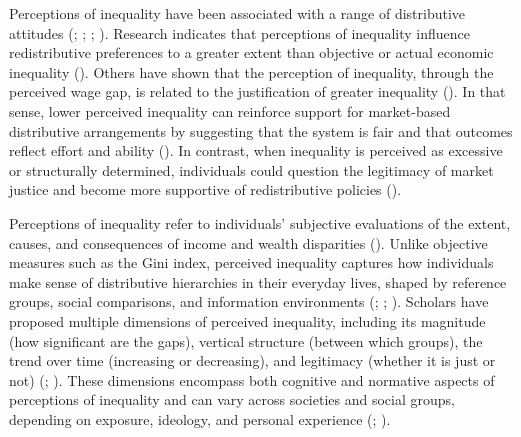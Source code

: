 \documentclass[
  12pt,
]{article}
\begin{document}
Perceptions of inequality have been associated with a range of
distributive attitudes (; ; ;
). Research indicates that
perceptions of inequality influence redistributive preferences to a
greater extent than objective or actual economic inequality
(). Others have shown that the perception of inequality, through the
perceived wage gap, is related to the justification of greater
inequality (). In that sense,
lower perceived inequality can reinforce support for market-based
distributive arrangements by suggesting that the system is fair and that
outcomes reflect effort and ability (). In contrast, when inequality is perceived as excessive or
structurally determined, individuals could question the legitimacy of
market justice and become more supportive of redistributive policies
().

Perceptions of inequality refer to individuals' subjective evaluations
of the extent, causes, and consequences of income and wealth disparities
(). Unlike objective
measures such as the Gini index, perceived inequality captures how
individuals make sense of distributive hierarchies in their everyday
lives, shaped by reference groups, social comparisons, and information
environments (; ; ).
Scholars have proposed multiple dimensions of perceived inequality,
including its magnitude (how significant are the gaps), vertical
structure (between which groups), the trend over time (increasing or
decreasing), and legitimacy (whether it is just or not)
(;
). These dimensions encompass both cognitive and normative aspects
of perceptions of inequality and can vary across societies and social
groups, depending on exposure, ideology, and personal experience
(;
).
\end{document}
